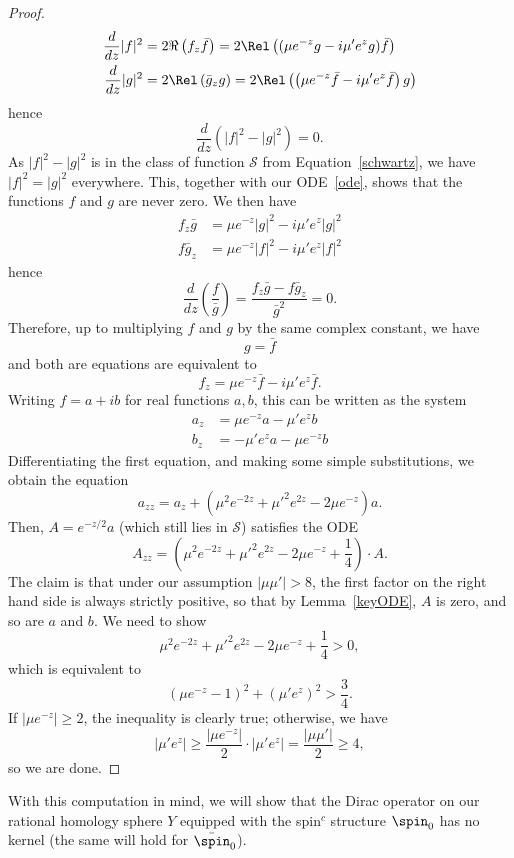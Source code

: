 \begin{proof}
\begin{align*}
\frac{d}{dz}|f|^2&=2\Re\left(f_z\bar{f}\right)=2\Rel\left((\mu e^{-z}g-i\mu'e^zg)\bar{f}\right)\\
\frac{d}{dz}|g|^2&=2\Rel\left(\bar{g}_z{g}\right)=2\Rel\left(\left(\mu e^{-z}\bar{f}-i\mu'e^z\bar{f}\right)g\right)
\end{align*}
hence
\[
\frac{d}{dz}(|f|^2-|g|^2)=0.
\]
As $|f|^2-|g|^2$ is in the class of function $\mathcal{S}$ from Equation~\eqref{schwartz}, we have $|f|^2=|g|^2$ everywhere. This, together with our ODE~\eqref{ode}, shows that the functions $f$ and $g$ are never zero. We then have
\begin{align*}
f_z\bar{g}&=\mu e^{-z}|g|^2-i\mu'e^{z}|g|^2\\
f\bar{g}_z&=\mu e^{-z}|f|^2-i\mu'e^{z}|f|^2
\end{align*}
hence
\[
\frac{d}{dz}\left(\frac{f}{\bar{g}}\right)=\frac{f_z\bar{g}-f\bar{g}_z}{\bar{g}^2}=0.
\]
Therefore, up to multiplying $f$ and $g$ by the same complex constant, we have
\[
g=\bar{f}
\]
and both are equations are equivalent to
\[
f_z=\mu e^{-z}\bar{f}-i\mu'e^{z}\bar{f}.
\]
Writing $f=a+ib$ for real functions $a,b$, this can be written as the system
\begin{align*}
a_z&=\mu e^{-z}a-\mu'e^zb\\
b_z&=-\mu'e^za-\mu e^{-z}b
\end{align*}
Differentiating the first equation, and making some simple substitutions, we obtain the equation
\[
a_{zz}=a_z+\left(\mu^2e^{-2z}+\mu'^2e^{2z}-2\mu e^{-z}\right)a.
\]
Then, $A=e^{-z/2}a$ (which still lies in $\mathcal{S}$) satisfies the ODE
\[
A_{zz}=\left(\mu^2e^{-2z}+\mu'^2e^{2z}-2\mu e^{-z}+\frac{1}{4}\right)\cdot A.
\]
The claim is that under our assumption $|\mu\mu'|>8$, the first factor on the right hand side is always strictly positive, so that by Lemma~\ref{keyODE}, $A$ is zero, and so are $a$ and $b$. We need to show
\[
\mu^2e^{-2z}+\mu'^2e^{2z}-2\mu e^{-z}+\frac{1}{4}>0,
\]
which is equivalent to
\[
(\mu e^{-z}-1)^2+(\mu'e^z)^2>\frac{3}{4}.
\]
If $|\mu e^{-z}|\geq 2$, the inequality is clearly true; otherwise, we have
\[
|\mu'e^z|\geq \frac{|\mu e^{-z}|}{2}\cdot |\mu' e^z|=\frac{|\mu\mu'|}{2}\geq 4,
\]
so we are done.
\end{proof}


With this computation in mind, we will show that the Dirac operator on our rational homology sphere $Y$ equipped with the spin$^c$ structure $\spin_0$ has no kernel (the same will hold for $\bar{\spin}_0$).



